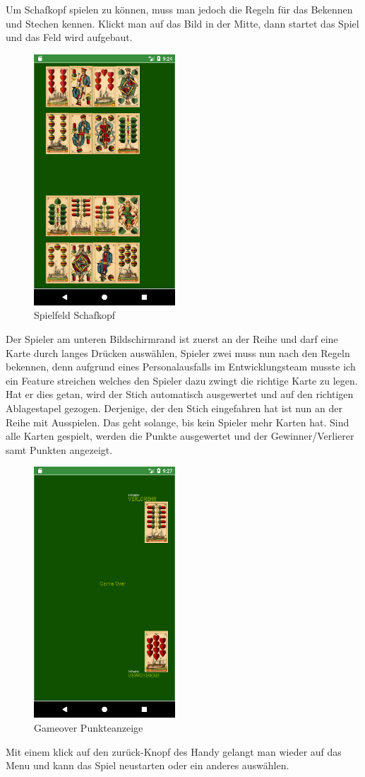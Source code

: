 Um Schafkopf spielen zu können, muss man jedoch die Regeln für das Bekennen und Stechen kennen. Klickt man auf das Bild in der Mitte, dann startet das Spiel und  das Feld wird aufgebaut. 
\begin{figure}[h]
	\centering
	\includegraphics{resources/kartenscreens/board}
	\caption{Spielfeld Schafkopf}
\end{figure}
Der Spieler am unteren Bildschirmrand ist zuerst an der Reihe und darf eine Karte durch langes Drücken auswählen, Spieler zwei muss nun nach den Regeln bekennen, denn aufgrund eines Personalausfalls im Entwicklungsteam musste ich ein Feature streichen welches den Spieler dazu zwingt die richtige Karte zu legen. Hat er dies getan, wird der Stich automatisch ausgewertet und auf den richtigen Ablagestapel gezogen. Derjenige, der den Stich eingefahren hat ist nun an der Reihe mit Ausspielen. Das geht solange, bis kein Spieler mehr Karten hat. Sind alle Karten gespielt, werden die Punkte ausgewertet und der Gewinner/Verlierer samt Punkten angezeigt.
\begin{figure}[h]
	\centering
	\includegraphics{resources/kartenscreens/gameover}
	\caption{Gameover Punkteanzeige}
\end{figure}
Mit einem klick auf den zurück-Knopf des Handy gelangt man wieder auf das Menu und kann das Spiel neustarten oder ein anderes auswählen.
